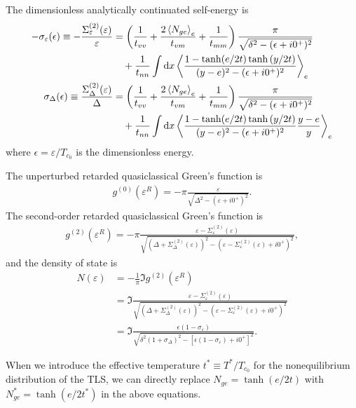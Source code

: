 \documentclass[aps,prl,preprint]{revtex4-2}
\begin{document}
The dimensionless analytically continuated self-energy is
\begin{align}
    - \sigma_\varepsilon(\epsilon) \equiv -\frac{\Sigma^{(2)}_\varepsilon(\varepsilon)}{\varepsilon} & = \left(\frac{1}{t_{vv}} + \frac{2\ev{N_{ge}}_e}{t_{vm}} + \frac{1}{t_{mm}}\right)\frac{\pi}{\sqrt{\delta^2 - (\epsilon+i0^+)^2}} \nonumber \\
                                                                                                     & \quad + \frac{1}{t_{nn}}\int\dd x\ev{\frac{1-\tanh(e/2t)\tanh{(y/2t)}}{(y-e)^2 - (\epsilon+i0^+)^2}}_e \nonumber                            \\
    \sigma_\Delta(\epsilon) \equiv \frac{\Sigma^{(2)}_\Delta(\varepsilon)}{\Delta}                   & = \left(\frac{1}{t_{vv}} + \frac{2\ev{N_{ge}}_e}{t_{vm}} + \frac{1}{t_{mm}}\right)\frac{\pi}{\sqrt{\delta^2 - (\epsilon+i0^+)^2}} \nonumber \\
                                                                                                     & \quad + \frac{1}{t_{nn}}\int\dd x\ev{\frac{1-\tanh(e/2t)\tanh{(y/2t)}}{(y-e)^2 - (\epsilon+i0^+)^2}\frac{y-e}{y}}_e \nonumber               \\
\end{align}
where $\epsilon = \varepsilon / T_{c_0}$ is the dimensionless energy.

The unperturbed retarded quasiclassical Green's function is
\begin{align}
    g^{(0)}(\varepsilon^R)
    = -\pi\frac{\varepsilon}
    {\sqrt{\Delta^2 - (\varepsilon+i0^+)^2}}.
\end{align}
The second-order retarded quasiclassical Green's function is
\begin{align}
    g^{(2)}(\varepsilon^R)
    = -\pi\frac{\varepsilon - \Sigma^{(2)}_\varepsilon(\varepsilon)}
    {\sqrt{(\Delta + \Sigma^{(2)}_\Delta(\varepsilon))^2
            - (\varepsilon - \Sigma^{(2)}_\varepsilon(\varepsilon) + i0^+)^2}},
\end{align}
and the density of state is
\begin{align}
    N(\varepsilon)
     & = -\frac{1}{\pi}\Im{g^{(2)}(\varepsilon^R)}                                                                                   \\
     & = \Im{\frac{\varepsilon - \Sigma^{(2)}_\varepsilon(\varepsilon)}
        {\sqrt{(\Delta + \Sigma^{(2)}_\Delta(\varepsilon))^2
                - (\varepsilon - \Sigma^{(2)}_\varepsilon(\varepsilon) + i0^+)^2}}}                                                  \\
     & = \Im{\frac{\epsilon(1-\sigma_\varepsilon)}{\sqrt{\delta^2(1+\sigma_\Delta)^2 - [\epsilon(1-\sigma_\varepsilon) + i0^+]^2}}}.
\end{align}

When we introduce the effective temperature $t^* \equiv T^*/T_{c_0}$ for the nonequilibrium distribution of the TLS,
we can directly replace $N_{ge} = \tanh(e/2t)$
with $N_{ge}^* = \tanh(e/2t^*)$ in the above equations.
\end{document}

